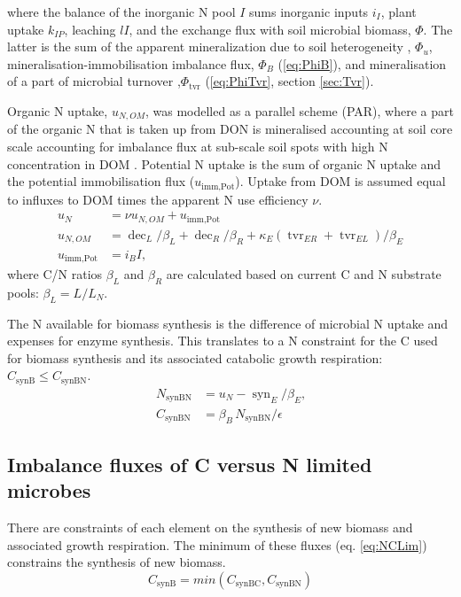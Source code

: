 \noindent where the balance of the inorganic N pool $I$ sums inorganic
inputs $i_I$, plant uptake $k_{IP}$, leaching $l I$, and the exchange flux with
soil microbial biomass, $\Phi$. The latter is the sum of the
apparent mineralization
due to soil heterogeneity \citep{Manzoni08}, $\Phi_u$, mineralisation-immobilisation
imbalance flux, $\Phi_B$ (\ref{eq:PhiB}), and mineralisation of a part of microbial
turnover ,$\Phi_{\operatorname{tvr}}$ (\ref{eq:PhiTvr}, section \ref{sec:Tvr}).

Organic N uptake, $u_{N,OM}$, was modelled as a parallel scheme (PAR),
where a part of the organic N that is taken up from DON is mineralised
accounting at soil core scale accounting for imbalance flux at sub-scale soil
spots with high N concentration in DOM \citep{Manzoni08}.
Potential N uptake is the sum of organic N uptake and the potential
immobilisation flux ($u_{\operatorname{imm,Pot}}$). Uptake from DOM is assumed
equal to influxes to DOM times the apparent N use efficiency $\nu$.
\begin{subequations}
\label{eq:uN}
\begin{align}
u_N &= \nu u_{N,OM} + u_{\operatorname{imm,Pot}}
\\
u_{N,OM} &= \operatorname{dec}_L/\beta_L + \operatorname{dec}_R/\beta_R +
\kappa_E (\operatorname{tvr}_{ER} + \operatorname{tvr}_{EL})/\beta_E
\\
u_{\operatorname{imm,Pot}} &= i_B I 
\text{,}
\end{align}
\end{subequations}
where C/N ratios $\beta_L$ and $\beta_R$ are calculated based on current C
and N substrate pools: $\beta_L = L/L_N$.  

The N available for biomass synthesis is the difference of microbial N
uptake and expenses for enzyme synthesis. This translates to a N
constraint for the C used for biomass synthesis and its associated
catabolic growth respiration: $C_{\operatorname{synB}} \le
C_{\operatorname{synBN}}$.
\begin{subequations}
\label{eq:synBN}
\begin{align}
N_{\operatorname{synBN}} &= u_N - \operatorname{syn}_E/\beta_E \text{,} \\
C_{\operatorname{synBN}} &= \beta_B \, N_{\operatorname{synBN}}  / \epsilon
\end{align}
\end{subequations}


\subsection{Imbalance fluxes of C versus N limited microbes }
There are constraints of each element on the synthesis of new
biomass and associated growth respiration. The minimum of these fluxes (eq.
\ref{eq:NCLim}) constrains the synthesis of new biomass. 
\begin{equation}
\label{eq:NCLim} 
C_{\operatorname{synB}} =
min(C_{\operatorname{synBC}}, C_{\operatorname{synBN}} )
\end{equation}

